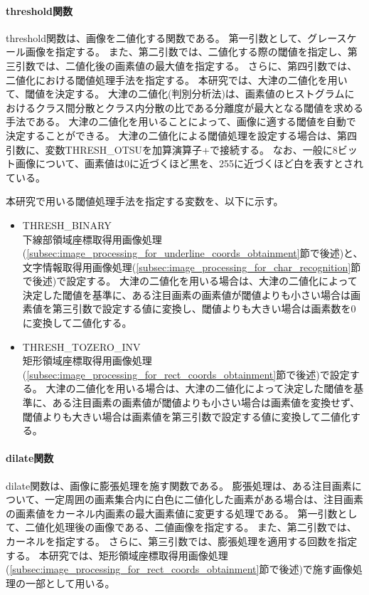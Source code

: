 \paragraph{threshold関数}
threshold関数は、画像を二値化する関数である。
第一引数として、グレースケール画像を指定する。
また、第二引数では、二値化する際の閾値を指定し、第三引数では、二値化後の画素値の最大値を指定する。
さらに、第四引数では、二値化における閾値処理手法を指定する。
本研究では、大津の二値化を用いて、閾値を決定する。
大津の二値化(判別分析法)は、画素値のヒストグラムにおけるクラス間分散とクラス内分散の比である分離度が最大となる閾値を求める手法である\cite{大津の二値化}。
大津の二値化を用いることによって、画像に適する閾値を自動で決定することができる。
大津の二値化による閾値処理を設定する場合は、第四引数に、変数THRESH\_OTSUを加算演算子+で接続する。
なお、一般に8ビット画像について、画素値は0に近づくほど黒を、255に近づくほど白を表すとされている\cite{画素値}。

本研究で用いる閾値処理手法を指定する変数を、以下に示す。

\begin{itemize}
	\item THRESH\_BINARY\\
		下線部領域座標取得用画像処理(\ref{subsec:image_processing_for_underline_coords_obtainment}節で後述)と、文字情報取得用画像処理(\ref{subsec:image_processing_for_char_recognition}節で後述)で設定する。
		大津の二値化を用いる場合は、大津の二値化によって決定した閾値を基準に、ある注目画素の画素値が閾値よりも小さい場合は画素値を第三引数で設定する値に変換し、閾値よりも大きい場合は画素数を0に変換して二値化する。
	\item THRESH\_TOZERO\_INV\\
		矩形領域座標取得用画像処理(\ref{subsec:image_processing_for_rect_coords_obtainment}節で後述)で設定する。
		大津の二値化を用いる場合は、大津の二値化によって決定した閾値を基準に、ある注目画素の画素値が閾値よりも小さい場合は画素値を変換せず、閾値よりも大きい場合は画素値を第三引数で設定する値に変換して二値化する。
\end{itemize}

\paragraph{dilate関数}
dilate関数は、画像に膨張処理を施す関数である。
膨張処理は、ある注目画素について、一定周囲の画素集合内に白色に二値化した画素がある場合は、注目画素の画素値をカーネル内画素の最大画素値に変更する処理である\cite{膨張処理}。
第一引数として、二値化処理後の画像である、二値画像を指定する。
また、第二引数では、カーネルを指定する。
さらに、第三引数では、膨張処理を適用する回数を指定する。
本研究では、矩形領域座標取得用画像処理(\ref{subsec:image_processing_for_rect_coords_obtainment}節で後述)で施す画像処理の一部として用いる。

